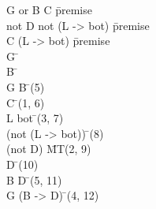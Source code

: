 \documentclass{article}
\begin{document}
\begin{proofbox}
\: G or B \rightarrow C \= \hbox{premise} \\
\: not D \rightarrow not (L -> bot) \= \hbox{premise} \\
\: C \rightarrow (L -> bot) \= \hbox{premise} \\
\open
\: G \= \asm \\
\open
\: B \= \asm \\
\: G \lor B \= \orintro(5) \\
\: C \= \implieselim(1, 6) \\
\: L \rightarrow bot \= \implieselim(3, 7) \\
\: \lnot (not (L -> bot)) \= \doublenegintro(8) \\
\: \lnot (not D) \= MT(2, 9) \\
\: D \= \doublenegelim(10) \\
\close
\: B \rightarrow D \= \impliesintro(5, 11) \\
\close
\: G \rightarrow (B -> D) \= \impliesintro(4, 12) \\
\end{proofbox}
\end{document}
